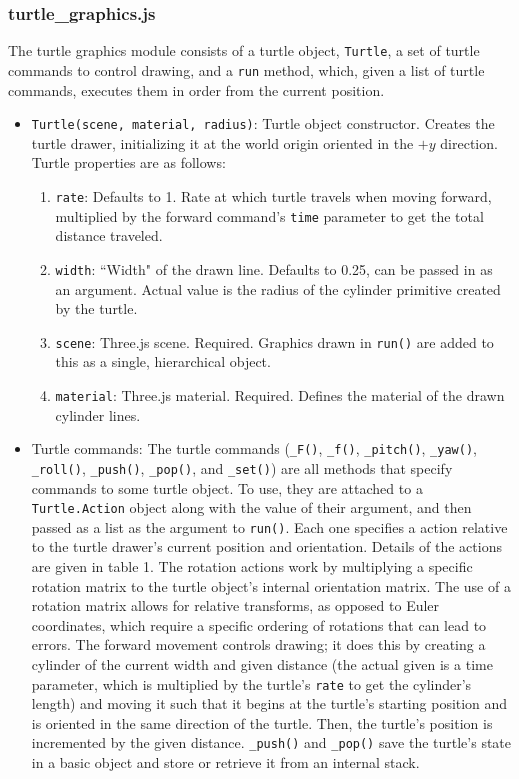\documentclass{article}
\newcommand{\tab}{\hspace*{2em}}
\begin{document}
            \subsubsection{turtle\_graphics.js}
    \tab The turtle graphics module consists of a turtle object, \verb|Turtle|, a set of turtle
commands to control drawing, and a \verb|run| method, which, given a list of turtle commands,
executes them in order from the current position.
\begin{itemize}
    \item \verb|Turtle(scene, material, radius)|: Turtle object constructor. Creates the turtle
drawer, initializing it at the world origin oriented in the $+y$ direction. Turtle properties
are as follows:
    \begin{enumerate}
        \item \verb|rate|: Defaults to 1. Rate at which turtle travels when moving forward,
    multiplied by the forward command's \verb|time| parameter to get the total distance traveled.
        \item \verb|width|: ``Width" of the drawn line. Defaults to 0.25, can be passed in as an
    argument. Actual value is the radius of the cylinder primitive created by the turtle.
        \item \verb|scene|: Three.js scene. Required. Graphics drawn in \verb|run()| are
    added to this as a single, hierarchical object.
        \item \verb|material|: Three.js material. Required. Defines the material of the
    drawn cylinder lines.
    \end{enumerate}

    \item Turtle commands: The turtle commands (\verb|_F()|, \verb|_f()|, \verb|_pitch()|,
\verb|_yaw()|, \verb|_roll()|, \verb|_push()|, \verb|_pop()|, and \verb|_set()|) are all methods
that specify commands to some turtle object. To use, they are attached to a \verb|Turtle.Action|
object along with the value of their argument, and then passed as a list as the argument to
\verb|run()|. Each one specifies a action relative to the turtle drawer's current position and
orientation. Details of the actions are given in table 1. The rotation actions work by
multiplying a specific rotation matrix to the turtle object's internal orientation matrix. The use
of a rotation matrix allows for relative transforms, as opposed to Euler coordinates, which require
a specific ordering of rotations that can lead to errors. The forward movement controls drawing; it
does this by creating a cylinder of the current width and given distance (the actual given is a
time parameter, which is multiplied by the turtle's \verb|rate| to get the cylinder's length) and
moving it such that it begins at the turtle's starting position and is oriented in the same
direction of the turtle. Then, the turtle's position is incremented by the given distance.
\verb|_push()| and \verb|_pop()| save the turtle's state in a basic object and store or retrieve it
from an internal stack.


\end{itemize}
\end{document}
